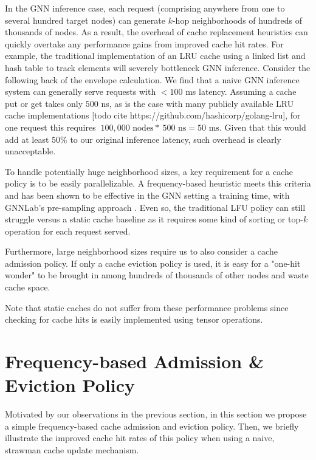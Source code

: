 In the GNN inference case, each request (comprising anywhere from one to several hundred target nodes) can generate $k$-hop neighborhoods of hundreds of thousands of nodes.
As a result, the overhead of cache replacement heuristics can quickly overtake any performance gains from improved cache hit rates. For example, the traditional implementation of an LRU cache using a linked list and hash table to track elements will severely bottleneck GNN inference. Consider the following back of the envelope calculation. We find that a naive GNN inference system can generally serve requests with $< 100$ ms latency. Assuming a cache put or get takes only $500$ ns, as is the case with many publicly available LRU cache implementations [todo cite https://github.com/hashicorp/golang-lru], for one request this requires $~100,000 \text{ nodes} * ~500 \text{ ns} = 50 \text{ ms}$. Given that this would add at least $50\%$ to our original inference latency, such overhead is clearly unacceptable. 

To handle potentially huge neighborhood sizes, a key requirement for a cache policy is to be easily parallelizable. A frequency-based heuristic meets this criteria and has been shown to be effective in the GNN setting a training time, with GNNLab's pre-sampling approach \cite{GNNLab_2022}. Even so, the traditional LFU policy can still struggle versus a static cache baseline as it requires some kind of sorting or top-$k$ operation for each request served.

Furthermore, large neighborhood sizes require us to also consider a cache admission policy. If only a cache eviction policy is used, it is easy for a "one-hit wonder" to be brought in among hundreds of thousands of other nodes and waste cache space.

Note that static caches do not suffer from these performance problems since checking for cache hits is easily implemented using tensor operations.


\section{Frequency-based Admission \& Eviction Policy} \label{Design: Policy}
Motivated by our observations in the previous section, in this section we propose a simple frequency-based cache admission and eviction policy. Then, we briefly illustrate the improved cache hit rates of this policy when using a naive, strawman cache update mechanism.

